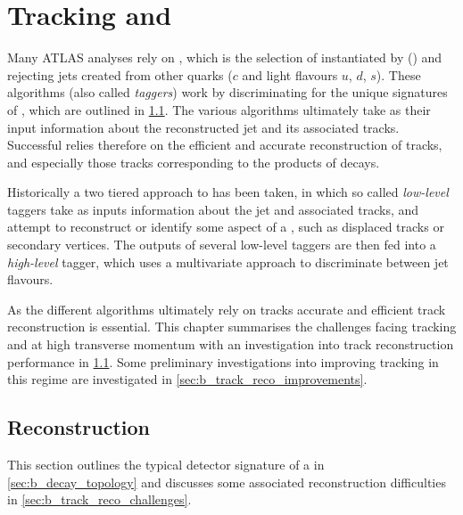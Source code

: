 \chapter{Tracking and \texorpdfstring{\btagging}{b-tagging}}\label{chap:tracking}

Many ATLAS analyses rely on \btagging, which is the selection of instantiated by \bquarks (\bjets) and rejecting jets created from other quarks ($c$ and light flavours $u$, $d$, $s$).
These \btagging algorithms (also called \textit{taggers}) work by discriminating for the unique signatures of \bjets, which are outlined in \cref{sec:b_had_reco}.
The various \btagging algorithms ultimately take as their input information about the reconstructed jet and its associated tracks.
Successful \btagging relies therefore on the efficient and accurate reconstruction of tracks, and especially those tracks corresponding to the products of \bhadron decays.

Historically a two tiered approach to \btagging has been taken, in which so called \textit{low-level} taggers take as inputs information about the jet and associated tracks, and attempt to reconstruct or identify some aspect of a \bjet, such as displaced tracks or secondary vertices.
The outputs of several low-level taggers are then fed into a \textit{high-level} tagger, which uses a multivariate approach to discriminate between jet flavours.

As the different \btagging algorithms ultimately rely on tracks accurate and efficient track reconstruction is essential.
This chapter summarises the challenges facing tracking and \btagging at high transverse momentum with an investigation into track reconstruction performance in \cref{sec:b_had_reco}.
Some preliminary investigations into improving tracking in this regime are investigated in \cref{sec:b_track_reco_improvements}.




\section{\texorpdfstring{\bhadron}{b-hadron} Reconstruction}
\label{sec:b_had_reco}

This section outlines the typical detector signature of a \bhadron in \cref{sec:b_decay_topology} and discusses some associated reconstruction difficulties in \cref{sec:b_track_reco_challenges}.

